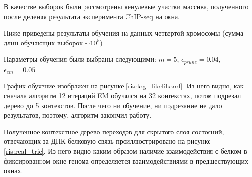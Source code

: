 \documentclass{matmex-diploma-custom}
\begin{document}
В качестве выборок были рассмотрены ненулевые участки массива, полученного после деления результата эксперимента ChIP-seq на окна.  

Ниже приведены результаты обучения на данных четвертой хромосомы (сумма длин обучающих выборок $\sim 10^5$)

Параметры обучения были выбраны следующими:
$m = 5$, $\epsilon_{\textit{prune}} = 0.04$, $\epsilon_{\textit{em}} = 0.05$

График обучение изображен на рисунке \ref{ris:log_likelihood}.
Из него видно, как сначала алгоритм 12 итераций EM обучался на 32 контекстах, потом подрезал дерево до 5 контекстов. После чего ни обучение, ни подрезание не дало результатов, поэтому, алгоритм закончил работу.

Полученное контекстное дерево переходов для скрытого слоя состояний, отвечающих за ДНК-белковую связь проиллюстрировано на рисунке \ref{ris:real_trie}. Из него видно каким образом наличие взаимодействия с белком в фиксированном окне генома определяется взаимодействиями в предшествующих окнах.
\end{document}
